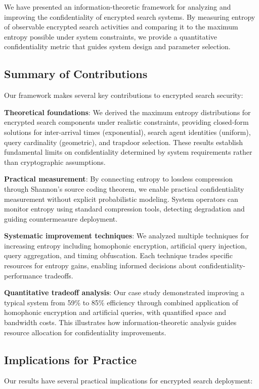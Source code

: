 \documentclass[final,11pt]{article}
\numberwithin{equation}{section}
\theoremstyle{plain}
\theoremstyle{remark}
\begin{document}
We have presented an information-theoretic framework for analyzing and improving the confidentiality of encrypted search systems. By measuring entropy of observable encrypted search activities and comparing it to the maximum entropy possible under system constraints, we provide a quantitative confidentiality metric that guides system design and parameter selection.

\subsection{Summary of Contributions}
Our framework makes several key contributions to encrypted search security:

\textbf{Theoretical foundations}: We derived the maximum entropy distributions for encrypted search components under realistic constraints, providing closed-form solutions for inter-arrival times (exponential), search agent identities (uniform), query cardinality (geometric), and trapdoor selection. These results establish fundamental limits on confidentiality determined by system requirements rather than cryptographic assumptions.

\textbf{Practical measurement}: By connecting entropy to lossless compression through Shannon's source coding theorem, we enable practical confidentiality measurement without explicit probabilistic modeling. System operators can monitor entropy using standard compression tools, detecting degradation and guiding countermeasure deployment.

\textbf{Systematic improvement techniques}: We analyzed multiple techniques for increasing entropy including homophonic encryption, artificial query injection, query aggregation, and timing obfuscation. Each technique trades specific resources for entropy gains, enabling informed decisions about confidentiality-performance tradeoffs.

\textbf{Quantitative tradeoff analysis}: Our case study demonstrated improving a typical system from 59\% to 85\% efficiency through combined application of homophonic encryption and artificial queries, with quantified space and bandwidth costs. This illustrates how information-theoretic analysis guides resource allocation for confidentiality improvements.

\subsection{Implications for Practice}
Our results have several practical implications for encrypted search deployment:
\end{document}
